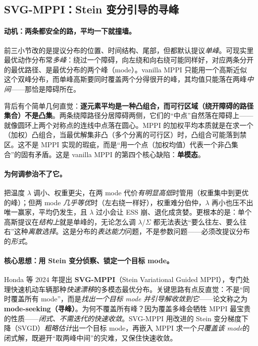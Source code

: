 \subsection{SVG-MPPI：Stein 变分引导的寻峰}
\label{sec:mv-svg}

\paragraph{动机：两条都安全的路，平均一下就撞墙。}
前三小节改的是提议分布的位置、时间结构、尾部，但都默认提议\emph{单峰}。可现实里最优动作分布常\emph{多峰}：绕过一个障碍，向左绕和向右绕可能同样好，对应两条分开的最优路径、是最优分布的两个峰（mode）。vanilla MPPI 只能用一个高斯近似这个双峰分布，而单峰高斯要同时覆盖两个分得很开的峰，其均值只能落在两峰\emph{中间}——那恰是障碍所在。

\begin{insight}
背后有个简单几何直觉：\textbf{逐元素平均是一种凸组合，而可行区域（绕开障碍的路径集合）不是凸集}。两条绕障路径分居障碍两侧，它们的“中点”自然落在障碍上——就像圆环上两个对称点的连线中点落在圆心。MPPI 的加权平均本质就是在求一个（加权）凸组合，当最优解集非凸（多个分离的可行区）时，凸组合可能落到禁区。这不是 MPPI 实现的瑕疵，而是“用一个点（加权均值）代表一个非凸集合”的固有矛盾。这是 vanilla MPPI 的第四个核心缺陷：\textbf{单模态}。
\end{insight}

\paragraph{为何调参治不了它。}
把温度 $\lambda$ 调小、权重更尖，在两 mode 代价\emph{有明显高低}时管用（权重集中到更优的峰）；但两 mode \emph{几乎等优}时（左右绕一样好），权重难分伯仲，$\lambda$ 再小也压不出唯一赢家，平均仍发生，且 $\lambda$ 过小会让 ESS 崩、退化成贪婪。更根本的是：单个高斯提议在\emph{结构上}就是单峰的，无论怎么调 $\lambda$/$\Sigma$ 都无法表达“要么往左、要么往右”这种\emph{离散选择}。这是分布的\emph{表达能力}问题，不是参数问题——必须改提议分布的\emph{形式}。

\paragraph{核心思想：用 Stein 变分侦察、锁定一个目标 mode。}
Honda 等 $2024$ 年提出 \textbf{SVG-MPPI}（Stein Variational Guided MPPI），专门处理快速机动车辆那种\emph{快速漂移}的多模态最优分布\cite{honda2024svgmppi}。关键思路有点反直觉：不是“同时覆盖所有 mode”，而是\emph{找出一个目标 mode 并引导解收敛到它}——论文称之为 \textbf{mode-seeking（寻峰）}。为何不覆盖所有峰？因为覆盖多峰会牺牲 MPPI 最宝贵的性质——\emph{闭式、不需迭代的快速收敛}。SVG-MPPI 用改进的 Stein 变分梯度下降（SVGD）\emph{粗略估计}出一个目标 mode，再嵌入 MPPI 求一个\emph{只覆盖该 mode}的闭式解，既避开“取两峰中间”的灾难，又保住快速收敛。

